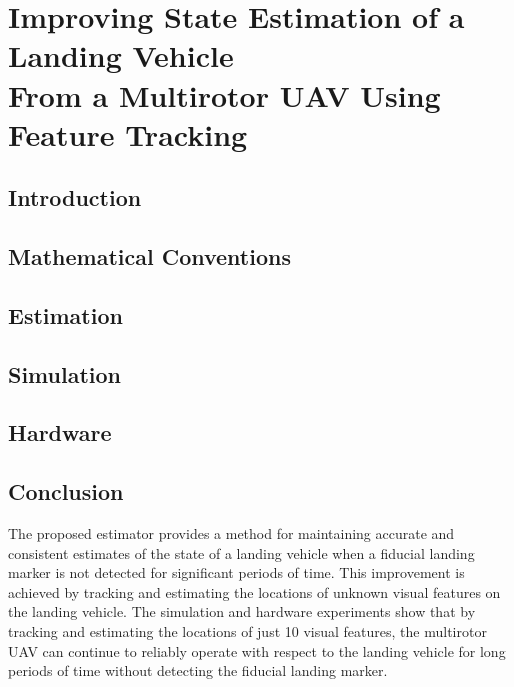 
\chapter{Improving State Estimation of a Landing Vehicle \\
From a Multirotor UAV Using Feature Tracking}
\label{chp:estimation_paper}

\graphicspath{{estimation_paper/}}

\section{Introduction} \label{sec:intro}



\section{Mathematical Conventions} \label{sec:model}




\section{Estimation} \label{sec:estimation}





\section{Simulation} \label{sec:simulation}


\section{Hardware} \label{sec:hardware}







\section{Conclusion} \label{sec:conclusion}
The proposed estimator provides a method for maintaining accurate and consistent
estimates of the state of a landing vehicle when a fiducial landing marker is
not detected for significant periods of time. This improvement is achieved by
tracking and estimating the locations of unknown visual features on the landing
vehicle. The simulation and hardware experiments show that by tracking and
estimating the locations of just 10 visual features, the multirotor UAV can
continue to reliably operate with respect to the landing vehicle for long
periods of time without detecting the fiducial landing marker.
